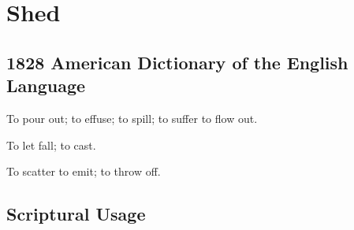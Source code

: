 \section{Shed}
	\label{SHED}
	

\subsection{1828 American Dictionary of the English Language} %
	\label{SHED-1828}

	\begin{compactitem}
		\item[1] To pour out; to effuse; to spill; to suffer to flow out.
		\item[2] To let fall; to cast.
		\item[3] To scatter to emit; to throw off.
	\end{compactitem}



\subsection{Scriptural Usage} %
	\label{SHED-SCRIPTURES}

	
	
